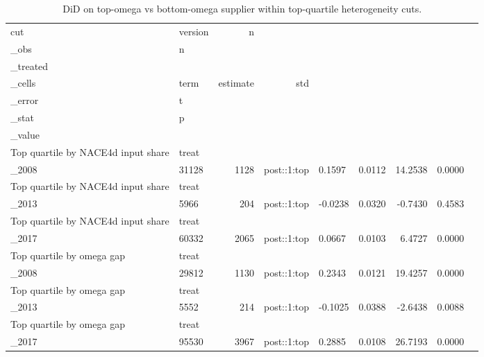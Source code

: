 \begin{table}[ht]
\centering
\caption{DiD on top-omega vs bottom-omega supplier within top-quartile heterogeneity cuts.} 
\begin{tabular}{llrrlrrrr}
  \toprule
cut & version & n\\_obs & n\\_treated\\_cells & term & estimate & std\\_error & t\\_stat & p\\_value \\ 
  \midrule
Top quartile by NACE4d input share & treat\\_2008 & 31128 &  1128 & post::1:top & 0.1597 & 0.0112 & 14.2538 & 0.0000 \\ 
  Top quartile by NACE4d input share & treat\\_2013 &  5966 &   204 & post::1:top & -0.0238 & 0.0320 & -0.7430 & 0.4583 \\ 
  Top quartile by NACE4d input share & treat\\_2017 & 60332 &  2065 & post::1:top & 0.0667 & 0.0103 & 6.4727 & 0.0000 \\ 
  Top quartile by omega gap & treat\\_2008 & 29812 &  1130 & post::1:top & 0.2343 & 0.0121 & 19.4257 & 0.0000 \\ 
  Top quartile by omega gap & treat\\_2013 &  5552 &   214 & post::1:top & -0.1025 & 0.0388 & -2.6438 & 0.0088 \\ 
  Top quartile by omega gap & treat\\_2017 & 95530 &  3967 & post::1:top & 0.2885 & 0.0108 & 26.7193 & 0.0000 \\ 
   \bottomrule
\end{tabular}
\end{table}

